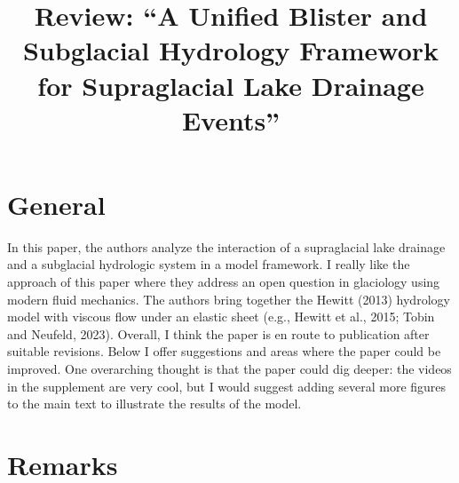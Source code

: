 \documentclass[11pt]{article}
\title{Review: ``A Unified Blister and Subglacial Hydrology Framework for Supraglacial Lake Drainage Events''}
\author{}
\date{}
\begin{document}
\maketitle

\section{General}

In this paper, the authors analyze the interaction of a supraglacial lake drainage and a
subglacial hydrologic system in a model framework. I really like the approach of this
paper where they address an open question in glaciology using modern fluid mechanics.
The authors bring together the Hewitt (2013) hydrology model with viscous flow under
an elastic sheet (e.g., Hewitt et al., 2015; Tobin and Neufeld, 2023). Overall, I think the
paper is en route to publication after suitable revisions. Below I offer suggestions and
areas where the paper could be improved. One overarching thought is that the paper
could dig deeper: the videos in the supplement are very cool, but I would suggest adding
several more figures to the main text to illustrate the results of the model.

\section{Remarks}
\end{document}
